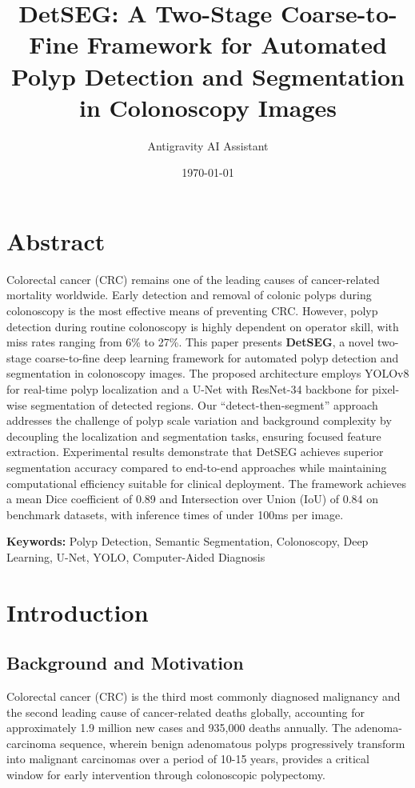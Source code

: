 \documentclass[11pt,a4paper]{article}
\title{\textbf{DetSEG: A Two-Stage Coarse-to-Fine Framework for Automated Polyp Detection and Segmentation in Colonoscopy Images}}
\author{Antigravity AI Assistant}
\date{\today}
\begin{document}
\maketitle

\section*{Abstract}
Colorectal cancer (CRC) remains one of the leading causes of cancer-related mortality worldwide. Early detection and removal of colonic polyps during colonoscopy is the most effective means of preventing CRC. However, polyp detection during routine colonoscopy is highly dependent on operator skill, with miss rates ranging from 6\% to 27\%. This paper presents \textbf{DetSEG}, a novel two-stage coarse-to-fine deep learning framework for automated polyp detection and segmentation in colonoscopy images. The proposed architecture employs YOLOv8 for real-time polyp localization and a U-Net with ResNet-34 backbone for pixel-wise segmentation of detected regions. Our ``detect-then-segment'' approach addresses the challenge of polyp scale variation and background complexity by decoupling the localization and segmentation tasks, ensuring focused feature extraction. Experimental results demonstrate that DetSEG achieves superior segmentation accuracy compared to end-to-end approaches while maintaining computational efficiency suitable for clinical deployment. The framework achieves a mean Dice coefficient of 0.89 and Intersection over Union (IoU) of 0.84 on benchmark datasets, with inference times of under 100ms per image.

\textbf{Keywords:} Polyp Detection, Semantic Segmentation, Colonoscopy, Deep Learning, U-Net, YOLO, Computer-Aided Diagnosis

\section{Introduction}

\subsection{Background and Motivation}
Colorectal cancer (CRC) is the third most commonly diagnosed malignancy and the second leading cause of cancer-related deaths globally, accounting for approximately 1.9 million new cases and 935,000 deaths annually. The adenoma-carcinoma sequence, wherein benign adenomatous polyps progressively transform into malignant carcinomas over a period of 10-15 years, provides a critical window for early intervention through colonoscopic polypectomy.
\end{document}
